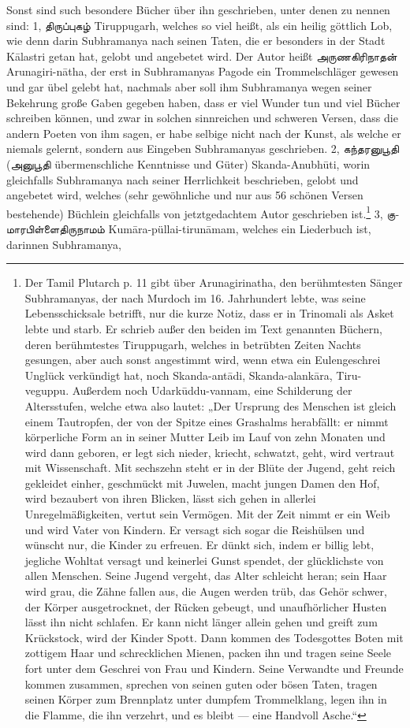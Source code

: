 \documentclass{article}
\newcommand{\TamilText}[1]{\texttamil{#1}}
\newcommand{\tam}[1]{\TamilText{#1}}
\begin{document}
Sonst sind such besondere Bücher über ihn geschrieben, unter denen zu nennen sind: 1, \tam{திருப்புகழ்} Tiruppugarh, welches so viel heißt, als ein heilig göttlich Lob, wie denn darin Subhramanya nach seinen Taten, die er besonders in der Stadt K\={a}lastri getan hat, gelobt und angebetet wird. Der Autor heißt \tam{அருணகிரிநாதன்} Arunagiri-n\={a}tha, der erst in Subhramanyas Pagode ein Trommelschläger gewesen und gar übel gelebt hat, nachmals aber soll ihm Subhramanya wegen seiner Bekehrung große Gaben gegeben haben, dass er viel Wunder tun und viel Bücher schreiben können, und zwar in solchen sinnreichen und schweren Versen, dass die andern Poeten von ihm sagen, er habe selbige nicht nach der Kunst, als welche er niemals gelernt, sondern aus Eingeben Subhramanyas geschrieben. 2, \tam{கந்தரனுபூதி} (\tam{அனுபூதி} übermenschliche Kenntnisse und Güter) Skanda-Anubh\={u}ti, worin gleichfalls Subhramanya nach seiner Herrlichkeit beschrieben, gelobt und angebetet wird, welches (sehr gewöhnliche und nur aus 56 schönen Versen bestehende) Büchlein gleichfalls von jetztgedachtem Autor geschrieben ist.\footnote{Der Tamil Plutarch p. 11 gibt über Arunagirinatha, den berühmtesten Sänger Subhramanyas, der nach Murdoch im 16. Jahrhundert lebte, was seine Lebensschicksale betrifft, nur die kurze Notiz, dass er in Trinomali als Asket lebte und starb. Er schrieb außer den beiden im Text genannten Büchern, deren berühmtestes Tiruppugarh, welches in betrübten Zeiten Nachts gesungen, aber auch sonst angestimmt wird, wenn etwa ein Eulengeschrei Unglück verkündigt hat, noch Skanda-ant\={a}di, Skanda-alank\={a}ra, Tiru-veguppu. Außerdem noch Udark\={u}ddu-vannam, eine Schilderung der Altersstufen, welche etwa also lautet: „Der Ursprung des Menschen ist gleich einem Tautropfen, der von der Spitze eines Grashalms herabfällt: er nimmt körperliche Form an in seiner Mutter Leib im Lauf von zehn Monaten und wird dann geboren, er legt sich nieder, kriecht, schwatzt, geht, wird vertraut mit Wissenschaft. Mit sechszehn steht er in der Blüte der Jugend, geht reich gekleidet einher, geschmückt mit Juwelen, macht jungen Damen den Hof, wird bezaubert von ihren Blicken, lässt sich gehen in allerlei Unregelmäßigkeiten, vertut sein Vermögen. Mit der Zeit nimmt er ein Weib und wird Vater von Kindern. Er versagt sich sogar die Reishülsen und wünscht nur, die Kinder zu erfreuen. Er dünkt sich, indem er billig lebt, jegliche Wohltat versagt und keinerlei Gunst spendet, der glücklichste von allen Menschen. Seine Jugend vergeht, das Alter schleicht heran; sein Haar wird grau, die Zähne fallen aus, die Augen werden trüb, das Gehör schwer, der Körper ausgetrocknet, der Rücken gebeugt, und unaufhörlicher Husten lässt ihn nicht schlafen. Er kann nicht länger allein gehen und greift zum Krückstock, wird der Kinder Spott. Dann kommen des Todesgottes Boten mit zottigem Haar und schrecklichen Mienen, packen ihn und tragen seine Seele fort unter dem Geschrei von Frau und Kindern. Seine Verwandte und Freunde kommen zusammen, sprechen von seinen guten oder bösen Taten, tragen seinen Körper zum Brennplatz unter dumpfem Trommelklang, legen ihn in die Flamme, die ihn verzehrt, und es bleibt — eine Handvoll Asche.“} 3, \tam{குமாரபிள்ளைதிருநாமம்} Kum\={a}ra-püllai-tirun\={a}mam, welches ein Liederbuch ist, darinnen Subhramanya, 
\end{document}
